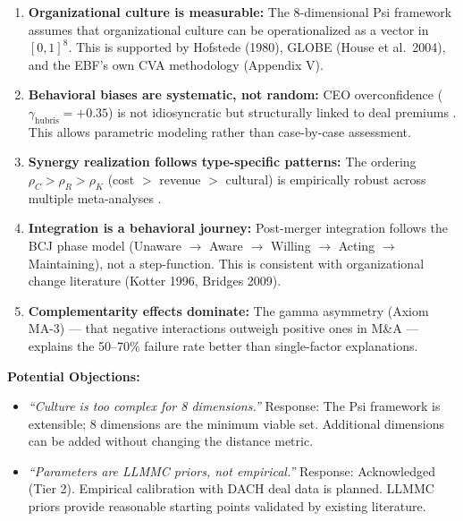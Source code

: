 \begin{enumerate}
\item \textbf{Organizational culture is measurable:} The 8-dimensional Psi framework
      assumes that organizational culture can be operationalized as a vector in
      $[0,1]^8$. This is supported by Hofstede (1980), GLOBE (House et al.\ 2004),
      and the EBF's own CVA methodology (Appendix V).

\item \textbf{Behavioral biases are systematic, not random:} CEO overconfidence
      ($\gamma_{\text{hubris}} = +0.35$) is not idiosyncratic but structurally linked
      to deal premiums \citep{malmendier2008ceos}. This allows parametric modeling
      rather than case-by-case assessment.

\item \textbf{Synergy realization follows type-specific patterns:} The ordering
      $\rho_C > \rho_R > \rho_K$ (cost $>$ revenue $>$ cultural) is empirically
      robust across multiple meta-analyses \citep{king2004meta, christofferson2004where}.

\item \textbf{Integration is a behavioral journey:} Post-merger integration follows
      the BCJ phase model (Unaware $\to$ Aware $\to$ Willing $\to$ Acting $\to$
      Maintaining), not a step-function. This is consistent with organizational
      change literature (Kotter 1996, Bridges 2009).

\item \textbf{Complementarity effects dominate:} The gamma asymmetry (Axiom MA-3)
      --- that negative interactions outweigh positive ones in M\&A --- explains the
      50--70\% failure rate better than single-factor explanations.
\end{enumerate}

\textbf{Potential Objections:}
\begin{itemize}[nosep]
\item \textit{``Culture is too complex for 8 dimensions.''} Response: The Psi framework
      is extensible; 8 dimensions are the minimum viable set. Additional dimensions
      can be added without changing the distance metric.
\item \textit{``Parameters are LLMMC priors, not empirical.''} Response: Acknowledged
      (Tier 2). Empirical calibration with DACH deal data is planned. LLMMC priors
      provide reasonable starting points validated by existing literature.
\end{itemize}


